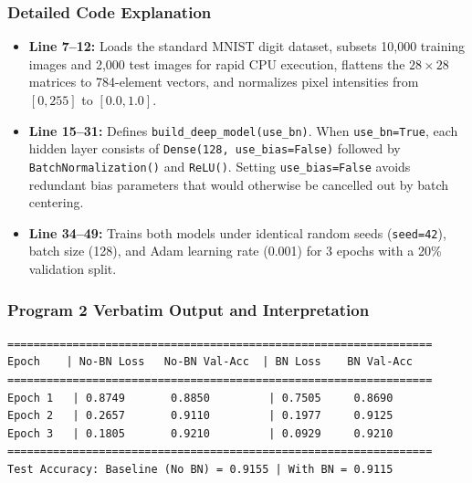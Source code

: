 \documentclass[12pt,a4paper]{article}
\begin{document}
\subsubsection*{Detailed Code Explanation}
\begin{itemize}[leftmargin=*]
    \item \textbf{Line 7--12:} Loads the standard MNIST digit dataset, subsets 10,000 training images and 2,000 test images for rapid CPU execution, flattens the $28\times28$ matrices to 784-element vectors, and normalizes pixel intensities from $[0, 255]$ to $[0.0, 1.0]$.
    \item \textbf{Line 15--31:} Defines \texttt{build\_deep\_model(use\_bn)}. When \texttt{use\_bn=True}, each hidden layer consists of \texttt{Dense(128, use\_bias=False)} followed by \texttt{BatchNormalization()} and \texttt{ReLU()}. Setting \texttt{use\_bias=False} avoids redundant bias parameters that would otherwise be cancelled out by batch centering.
    \item \textbf{Line 34--49:} Trains both models under identical random seeds (\texttt{seed=42}), batch size (128), and Adam learning rate (0.001) for 3 epochs with a 20\% validation split.
\end{itemize}

\subsubsection*{Program 2 Verbatim Output and Interpretation}
\begin{verbatim}
=================================================================
Epoch    | No-BN Loss   No-BN Val-Acc  | BN Loss    BN Val-Acc  
=================================================================
Epoch 1   | 0.8749       0.8850         | 0.7505     0.8690    
Epoch 2   | 0.2657       0.9110         | 0.1977     0.9125    
Epoch 3   | 0.1805       0.9210         | 0.0929     0.9210    
=================================================================
Test Accuracy: Baseline (No BN) = 0.9155 | With BN = 0.9115
\end{verbatim}
\end{document}
